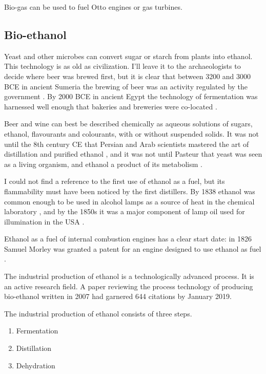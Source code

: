 Bio-gas can be used to fuel Otto engines or gas turbines. 

\subsection{Bio-ethanol}

Yeast and other microbes can convert sugar or starch from plants into ethanol.
This technology is as old as civilization. I'll leave it to the archaeologists
to decide where beer was brewed first, but it is clear that between 3200 and
3000 BCE in ancient Sumeria the brewing of beer was an activity regulated by the
government \autocite{Damerow2012}. By 2000 BCE in ancient Egypt the technology of
fermentation was harnessed well enough that bakeries and breweries were
co-located \autocite{1920}.

Beer and wine can best be described chemically as aqueous solutions of sugars,
ethanol, flavourants and colourants, with or without suspended solids. It was
not until the 8th century CE that Persian and Arab scientists mastered the art
of distillation and purified ethanol \autocite{Modanlou2008}, and it was not
until Pasteur that yeast was seen as a living organism, and ethanol a product of
its metabolism \autocite{Barnett2000}.

I could not find a reference to the first use of ethanol as a fuel, but its
flammability must have been noticed by the first distillers. By 1838 ethanol
was common enough to be used in alcohol lamps as a source of heat in the
chemical laboratory \autocite{Griffin1838}, and by the 1850s it was a major
component of lamp oil used for illumination in the USA \autocite{Abebe2008}.

Ethanol as a fuel of internal combustion engines has a clear start date: in 1826
Samuel Morley was granted a patent for an engine designed to use ethanol as fuel
\autocite[p. 79]{Cummins1989}.

The industrial production of ethanol is a technologically advanced process. It
is an active research field. A paper \autocite{Cardona2007} reviewing the process
technology of producing bio-ethanol written in 2007 had garnered 644 citations
by January 2019.

The industrial production of ethanol consists of three steps. 

\begin{enumerate}
  \item Fermentation
  \item Distillation
  \item Dehydration
\end{enumerate} 

